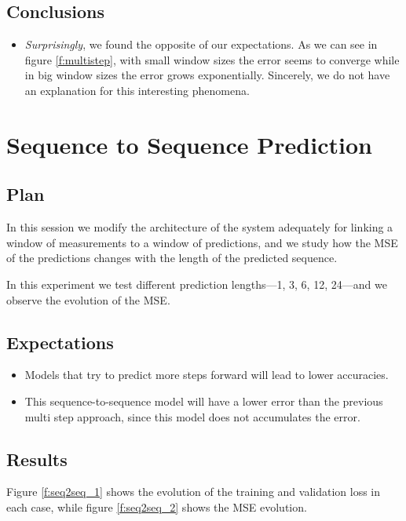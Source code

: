 \documentclass[]{article}
\begin{document}
	\subsection{Conclusions}
	
	\begin{itemize}
		\item \emph{Surprisingly}, we found the opposite of our expectations. As we can see in figure \ref{f:multistep}, with small window sizes the error seems to converge while in big window sizes the error grows exponentially. Sincerely, we do not have an explanation for this interesting phenomena.
	\end{itemize}
	
	\section{Sequence to Sequence Prediction}
	
	\subsection{Plan}
	
	In this session we modify the architecture of the system adequately for linking a window of measurements to a window of predictions, and we study how the MSE of the predictions changes with the length of the predicted sequence.
	
	In this experiment we test different prediction lengths---1, 3, 6, 12, 24---and we observe the evolution of the MSE.
	
	\subsection{Expectations}
	
	\begin{itemize}
		\item Models that try to predict more steps forward will lead to lower accuracies.
		\item This sequence-to-sequence model will have a lower error than the previous multi step approach, since this model does not accumulates the error.
	\end{itemize}
	
	\subsection{Results}
	
	Figure \ref{f:seq2seq_1} shows the evolution of the training and validation loss in each case, while figure \ref{f:seq2seq_2} shows the MSE evolution.
	
\end{document}
